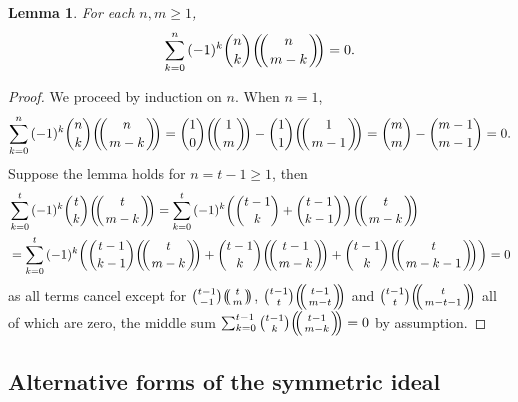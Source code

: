 \documentclass{article}
\theoremstyle{plain}
\newtheorem{lem}[thm]{Lemma}
\theoremstyle{definition}
\numberwithin{thm}{section}
\begin{document}
			\begin{lem}\label{lem:combino}
				For each $n,m\geq 1$,
				\begin{equation*}
						\sum^n_{k=0}{(-1)^k\binom{n}{k}{\ensuremath{\left(\kern-.3em\left(\genfrac{}{}{0pt}{}{{n}}{{m-k}}\right)\kern-.3em\right)}}}=0.
				\end{equation*}
			\end{lem}
			\begin{proof}
				We proceed by induction on $n$.
				When $n=1$, 
				\begin{equation*}
						\sum^n_{k=0}{(-1)^k\binom{n}{k}{\ensuremath{\left(\kern-.3em\left(\genfrac{}{}{0pt}{}{{n}}{{m-k}}\right)\kern-.3em\right)}}}
						=\binom{1}{0}{\ensuremath{\left(\kern-.3em\left(\genfrac{}{}{0pt}{}{{1}}{{m}}\right)\kern-.3em\right)}}-\binom{1}{1}{\ensuremath{\left(\kern-.3em\left(\genfrac{}{}{0pt}{}{{1}}{{m-1}}\right)\kern-.3em\right)}}
						=\binom{m}{m}-\binom{m-1}{m-1}=0.
				\end{equation*}
				Suppose the lemma holds for $n=t-1\geq1$, then
				\begin{align*}
						&\sum^t_{k=0}{(-1)^k\binom{t}{k}{\ensuremath{\left(\kern-.3em\left(\genfrac{}{}{0pt}{}{{t}}{{m-k}}\right)\kern-.3em\right)}}}
						=\sum^t_{k=0}{(-1)^k\bigg(\binom{t-1}{k}+\binom{t-1}{k-1}\bigg){\ensuremath{\left(\kern-.3em\left(\genfrac{}{}{0pt}{}{{t}}{{m-k}}\right)\kern-.3em\right)}}} \\
						&=\sum^t_{k=0}{(-1)^k\bigg(\binom{t-1}{k-1}{\ensuremath{\left(\kern-.3em\left(\genfrac{}{}{0pt}{}{{t}}{{m-k}}\right)\kern-.3em\right)}}+\binom{t-1}{k}{\ensuremath{\left(\kern-.3em\left(\genfrac{}{}{0pt}{}{{t-1}}{{m-k}}\right)\kern-.3em\right)}}+\binom{t-1}{k}{\ensuremath{\left(\kern-.3em\left(\genfrac{}{}{0pt}{}{{t}}{{m-k-1}}\right)\kern-.3em\right)}}\bigg)}=0
				\end{align*}
				as all terms cancel except for $\binom{t-1}{-1}{\ensuremath{\left(\kern-.3em\left(\genfrac{}{}{0pt}{}{{t}}{{m}}\right)\kern-.3em\right)}}$, $\binom{t-1}{t}{\ensuremath{\left(\kern-.3em\left(\genfrac{}{}{0pt}{}{{t-1}}{{m-t}}\right)\kern-.3em\right)}}$ and $\binom{t-1}{t}{\ensuremath{\left(\kern-.3em\left(\genfrac{}{}{0pt}{}{{t}}{{m-t-1}}\right)\kern-.3em\right)}}$
				all of which are zero, the middle sum $\sum^{t-1}_{k=0}{\binom{t-1}{k}{\ensuremath{\left(\kern-.3em\left(\genfrac{}{}{0pt}{}{{t-1}}{{m-k}}\right)\kern-.3em\right)}}}=0$ by assumption.
		\end{proof}
			
		\subsection{Alternative forms of the symmetric ideal}\label{subsec:IdeaForms}
			
\end{document}
